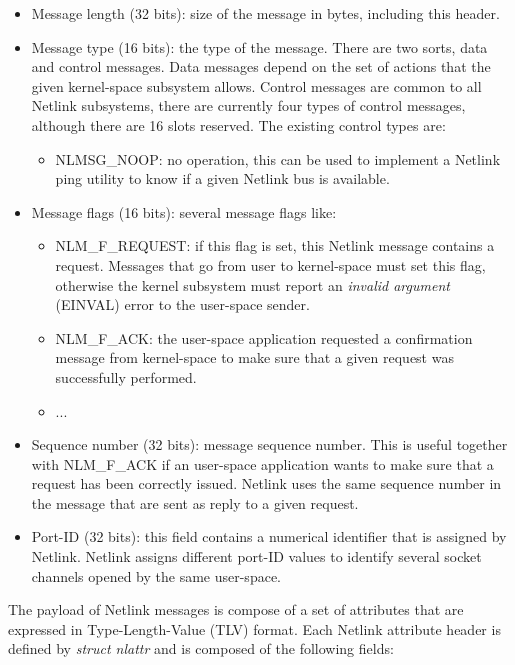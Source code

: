 \documentclass[10pt,onecolumn]{article}
\begin{document}
\begin{itemize}
\item Message length (32 bits): size of the message in bytes, including this header.
\item Message type (16 bits): the type of the message. There are two sorts, data and control messages. Data messages depend on the set of actions that the given kernel-space subsystem allows. Control messages are common to all Netlink subsystems, there are currently four types of control messages, although there are 16 slots reserved. The existing control types are:
  \begin{itemize}
  \item NLMSG\_NOOP: no operation, this can be used to implement a Netlink ping utility to know if a given Netlink bus is available.
  \end{itemize}
\item Message flags (16 bits): several message flags like:
  \begin{itemize}
  \item NLM\_F\_REQUEST: if this flag is set, this Netlink message contains a request. Messages that go from user to kernel-space must set this flag, otherwise the kernel subsystem must report an \textit{invalid argument} (EINVAL) error to the user-space sender.
  \item NLM\_F\_ACK: the user-space application requested a confirmation message from kernel-space to make sure that a given request was successfully performed.
  \item ...
  \end{itemize}
\item Sequence number (32 bits): message sequence number. This is useful together with NLM\_F\_ACK if an user-space application wants to make sure that a request has been correctly issued. Netlink uses the same sequence number in the message that are sent as reply to a given request.
\item Port-ID (32 bits): this field contains a numerical identifier that is assigned by Netlink. Netlink assigns different port-ID values to identify several socket channels opened by the same user-space.
\end{itemize}

The payload of Netlink messages is compose of a set of attributes that are expressed in Type-Length-Value (TLV) format. Each Netlink attribute header is defined by \textit{struct nlattr} and is composed of the following fields:
\end{document}
